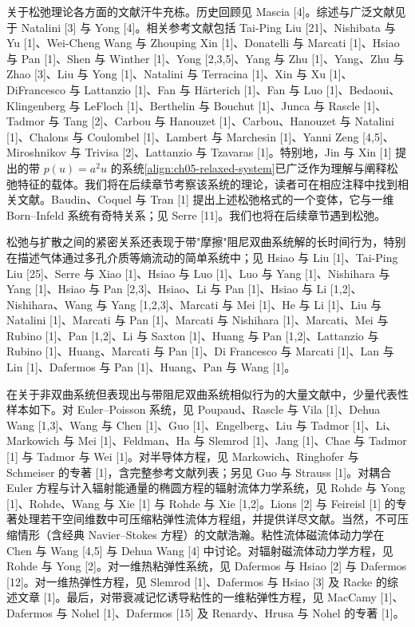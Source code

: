 \documentclass[../../main.tex]{subfiles}
\begin{document}
关于松弛理论各方面的文献汗牛充栋。历史回顾见 Mascia [4]。综述与广泛文献见于 Natalini [3] 与 Yong [4]。相关参考文献包括 Tai-Ping Liu [21]、Nishibata 与 Yu [1]、Wei-Cheng Wang 与 Zhouping Xin [1]、Donatelli 与 Marcati [1]、Hsiao 与 Pan [1]、Shen 与 Winther [1]、Yong [2,3,5]、Yang 与 Zhu [1]、Yang、Zhu 与 Zhao [3]、Liu 与 Yong [1]、Natalini 与 Terracina [1]、Xin 与 Xu [1]、DiFrancesco 与 Lattanzio [1]、Fan 与 Härterich [1]、Fan 与 Luo [1]、Bedaoui、Klingenberg 与 LeFloch [1]、Berthelin 与 Bouchut [1]、Junca 与 Rascle [1]、Tadmor 与 Tang [2]、Carbou 与 Hanouzet [1]、Carbou、Hanouzet 与 Natalini [1]、Chalons 与 Coulombel [1]、Lambert 与 Marchesin [1]、Yanni Zeng [4,5]、Miroshnikov 与 Trivisa [2]、Lattanzio 与 Tzavaras [1]。特别地，Jin 与 Xin [1] 提出的带 $p(u)=a^{2}u$ 的系统\eqref{align:ch05-relaxed-system}已广泛作为理解与阐释松弛特征的载体。我们将在后续章节考察该系统的理论，读者可在相应注释中找到相关文献。Baudin、Coquel 与 Tran [1] 提出上述松弛格式的一个变体，它与一维 Born--Infeld 系统有奇特关系；见 Serre [11]。我们也将在后续章节遇到松弛。

松弛与扩散之间的紧密关系还表现于带"摩擦"阻尼双曲系统解的长时间行为，特别在描述气体通过多孔介质等熵流动的简单系统中；见 Hsiao 与 Liu [1]、Tai-Ping Liu [25]、Serre 与 Xiao [1]、Hsiao 与 Luo [1]、Luo 与 Yang [1]、Nishihara 与 Yang [1]、Hsiao 与 Pan [2,3]、Hsiao、Li 与 Pan [1]、Hsiao 与 Li [1,2]、Nishihara、Wang 与 Yang [1,2,3]、Marcati 与 Mei [1]、He 与 Li [1]、Liu 与 Natalini [1]、Marcati 与 Pan [1]、Marcati 与 Nishihara [1]、Marcati、Mei 与 Rubino [1]、Pan [1,2]、Li 与 Saxton [1]、Huang 与 Pan [1,2]、Lattanzio 与 Rubino [1]、Huang、Marcati 与 Pan [1]、Di Francesco 与 Marcati [1]、Lan 与 Lin [1]、Dafermos 与 Pan [1]、Huang、Pan 与 Wang [1]。

在关于非双曲系统但表现出与带阻尼双曲系统相似行为的大量文献中，少量代表性样本如下。对 Euler--Poisson 系统，见 Poupaud、Rascle 与 Vila [1]、Dehua Wang [1,3]、Wang 与 Chen [1]、Guo [1]、Engelberg、Liu 与 Tadmor [1]、Li、Markowich 与 Mei [1]、Feldman、Ha 与 Slemrod [1]、Jang [1]、Chae 与 Tadmor [1] 与 Tadmor 与 Wei [1]。对半导体方程，见 Markowich、Ringhofer 与 Schmeiser 的专著 [1]，含完整参考文献列表；另见 Guo 与 Strauss [1]。对耦合 Euler 方程与计入辐射能通量的椭圆方程的辐射流体力学系统，见 Rohde 与 Yong [1]、Rohde、Wang 与 Xie [1] 与 Rohde 与 Xie [1,2]。Lions [2] 与 Feireisl [1] 的专著处理若干空间维数中可压缩粘弹性流体方程组，并提供详尽文献。当然，不可压缩情形（含经典 Navier--Stokes 方程）的文献浩瀚。粘性流体磁流体动力学在 Chen 与 Wang [4,5] 与 Dehua Wang [4] 中讨论。对辐射磁流体动力学方程，见 Rohde 与 Yong [2]。对一维热粘弹性系统，见 Dafermos 与 Hsiao [2] 与 Dafermos [12]。对一维热弹性方程，见 Slemrod [1]、Dafermos 与 Hsiao [3] 及 Racke 的综述文章 [1]。最后，对带衰减记忆诱导粘性的一维粘弹性方程，见 MacCamy [1]、Dafermos 与 Nohel [1]、Dafermos [15] 及 Renardy、Hrusa 与 Nohel 的专著 [1]。
\end{document}
